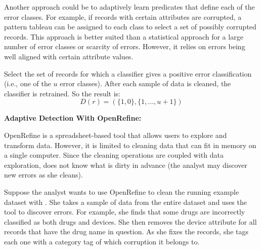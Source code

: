 Another approach could be to adaptively learn predicates that define each of the error classes.
For example, if records with certain attributes are corrupted, a pattern tableau can be assigned to each class to select a set of possibly corrupted records.
This approach is better suited than a statistical approach for a large number of error classes or scarcity of errors.
However, it relies on errors being well aligned with certain attribute values.

\begin{definition}
Select the set of records for which a classifier gives a positive error classification (i.e., one of the $u$ error classes).
After each sample of data is cleaned, the classifier is retrained.
So the result is:
\[D(r) = (\{1,0\},\{1,...,u+1\})\]
\end{definition}

\vspace{0.75em}

\noindent\textbf{Adaptive Detection With OpenRefine: }
\begin{example}\label{detex2}
OpenRefine is a spreadsheet-based tool that allows users to explore and transform data.
However, it is limited to cleaning data that can fit in memory on a single computer.
Since the cleaning operations are coupled with data exploration, \sys does not know what is dirty in advance (the analyst may discover new errors as she cleans).

Suppose the analyst wants to use OpenRefine to clean the running example dataset with \sys.
She takes a sample of data from the entire dataset and uses the tool to discover errors.
For example, she finds that some drugs are incorrectly classified as both drugs and devices.
She then removes the device attribute for all records that have the drug name in question.
As she fixes the records, she tags each one with a category tag of which corruption it belongs to.
\end{example}





